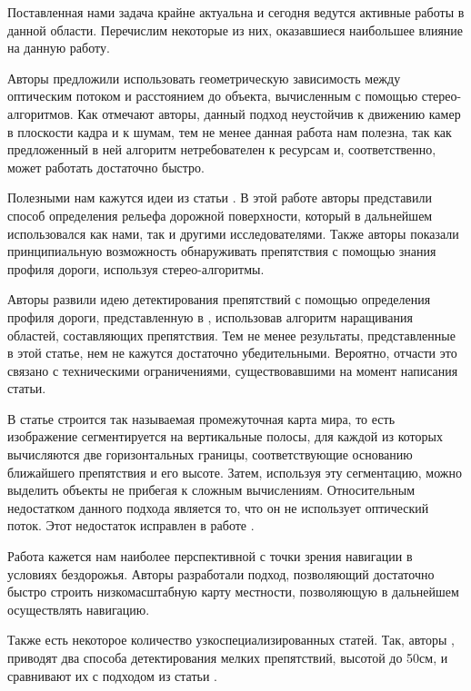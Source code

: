 \documentclass[aps,%
14pt,%
final,%
oneside,
onecolumn,%
musixtex, %
superscriptaddress,%
centertags]{extarticle} %
\begin{document}
Поставленная нами задача крайне актуальна и сегодня ведутся активные работы в данной области. Перечислим некоторые из них, оказавшиеся наибольшее влияние на данную работу.

Авторы \cite{heinrich2002fast} предложили использовать геометрическую зависимость между оптическим потоком и расстоянием до объекта, вычисленным с помощью стерео-алгоритмов. Как отмечают авторы, данный подход неустойчив к движению камер в плоскости кадра и к шумам, тем не менее данная работа нам полезна, так как предложенный в ней алгоритм нетребователен к ресурсам и, соответственно, может работать достаточно быстро.

Полезными нам кажутся идеи из статьи \cite{labayrade2002real}. В этой работе авторы представили способ определения рельефа дорожной поверхности, который в дальнейшем использовался как нами, так и другими исследователями. Также авторы показали принципиальную возможность обнаруживать препятствия с помощью знания профиля дороги, используя стерео-алгоритмы.

Авторы \cite{broggi2006single} развили идею детектирования препятствий с помощью определения профиля дороги, представленную в \cite{labayrade2002real}, использовав алгоритм наращивания областей, составляющих препятствия. Тем не менее результаты, представленные в этой статье, нем не кажутся достаточно убедительными. Вероятно, отчасти это связано с техническими ограничениями, существовавшими на момент написания статьи.

В статье \cite{pfeiffer2010efficient} строится так называемая промежуточная карта мира, то есть изображение сегментируется на вертикальные полосы, для каждой из которых вычисляются две горизонтальных границы, соответствующие основанию ближайшего препятствия и его высоте. Затем, используя эту сегментацию, можно выделить объекты не прибегая к сложным вычислениям. Относительным недостатком данного подхода является то, что он не использует оптический поток. Этот недостаток исправлен в работе \cite{benenson2011stixels}.

Работа \cite{broggi2013terrain} кажется нам наиболее перспективной с точки зрения навигации в условиях бездорожья. Авторы разработали подход, позволяющий достаточно быстро строить низкомасштабную карту местности, позволяющую в дальнейшем осуществлять навигацию.

Также есть некоторое количество узкоспециализированных статей. Так, авторы \cite{pinggera2016lost}, приводят два способа детектирования мелких препятствий, высотой до 50см, и сравнивают их с подходом из статьи \cite{pfeiffer2010efficient}.
\end{document}
